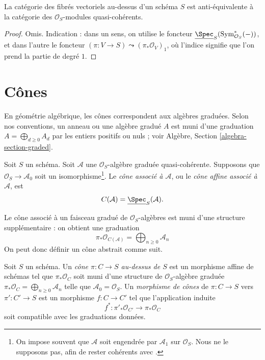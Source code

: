 \begin{lemma}
\label{lemma-category-vector-bundles}
La catégorie des fibrés vectoriels au-dessus d'un schéma $S$ est
anti-équivalente à la catégorie des $\mathcal{O}_S$-modules quasi-cohérents.
\end{lemma}

\begin{proof}
Omis. Indication : dans un sens, on utilise le foncteur
$\underline{\Spec}_S(\text{Sym}^*_{\mathcal{O}_S}(-))$,
et dans l'autre le foncteur
$(\pi : V \to S) \leadsto (\pi_*\mathcal{O}_V)_1$, où l'indice
signifie que l'on prend la partie de degré $1$.
\end{proof}




\section{Cônes}
\label{section-cone}

\noindent
En géométrie algébrique, les cônes correspondent aux algèbres graduées.
Selon nos conventions, un anneau ou une algèbre gradué $A$ est muni d'une graduation
$A = \bigoplus_{d \geq 0} A_d$ par les entiers positifs ou nuls ; voir
Algèbre, Section \ref{algebra-section-graded}.

\begin{definition}
\label{definition-cone}
Soit $S$ un schéma. Soit $\mathcal{A}$ une
$\mathcal{O}_S$-algèbre graduée quasi-cohérente. Supposons que
$\mathcal{O}_S \to \mathcal{A}_0$ soit un isomorphisme\footnote{On impose
souvent que $\mathcal{A}$ soit engendrée par $\mathcal{A}_1$ sur
$\mathcal{O}_S$. Nous ne le supposons pas, afin de rester cohérents avec
\cite[II, (8.3.1)]{EGA}.}.
Le {\it cône associé à $\mathcal{A}$}, ou le
{\it cône affine associé à $\mathcal{A}$}, est
$$
C(\mathcal{A}) = \underline{\Spec}_S(\mathcal{A}).
$$
\end{definition}

\noindent
Le cône associé à un faisceau gradué de $\mathcal{O}_S$-algèbres
est muni d'une structure supplémentaire : on obtient une graduation
$$
\pi_*\mathcal{O}_{C(\mathcal{A})} =
\bigoplus\nolimits_{n \geq 0} \mathcal{A}_n
$$
On peut donc définir un cône abstrait comme suit.

\begin{definition}
\label{definition-abstract-cone}
Soit $S$ un schéma. Un {\it cône $\pi : C \to S$ au-dessus de $S$} est un
morphisme affine de schémas tel que $\pi_*\mathcal{O}_C$ soit muni d'une
structure de $\mathcal{O}_S$-algèbre graduée
$\pi_*\mathcal{O}_C = \bigoplus\nolimits_{n \geq 0} \mathcal{A}_n$
telle que $\mathcal{A}_0 = \mathcal{O}_S$. Un {\it morphisme de cônes}
de $\pi : C \to S$ vers $\pi' : C' \to S$
est un morphisme $f : C \to C'$ tel que l'application induite
$$
f^* : \pi'_*\mathcal{O}_{C'} \longrightarrow \pi_*\mathcal{O}_C
$$
soit compatible avec les graduations données.
\end{definition}

